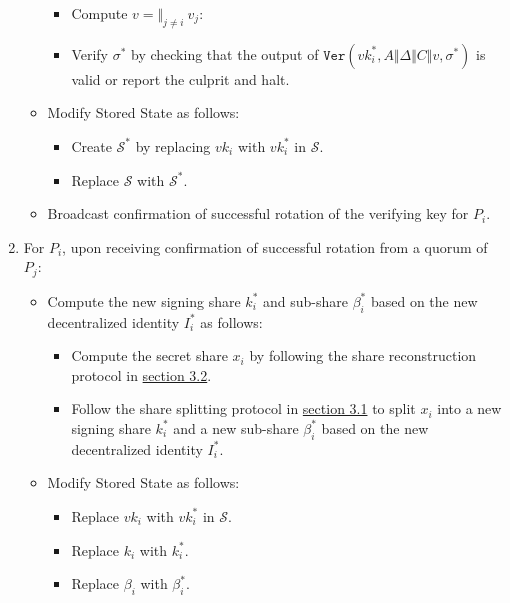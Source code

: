 \documentclass[
]{article}
\providecommand{\tightlist}{%
  \setlength{\itemsep}{0pt}\setlength{\parskip}{0pt}}
\begin{document}
\begin{enumerate}
\begin{itemize}
    \begin{itemize}
    \tightlist
    \item
      Compute \(v = \Vert _{j \neq i} \: v_j\):
    \item
      Verify \(\sigma ^ \ast\) by checking that the output of
      \(\mathtt{Ver}(vk_i^ \ast, A \Vert \Delta \Vert C \Vert v, \sigma ^ \ast)\)
      is valid or report the culprit and halt.
    \end{itemize}
  \item
    Modify Stored State as follows:

    \begin{itemize}
    \tightlist
    \item
      Create \(\mathcal{S} ^ \ast\) by replacing \(vk_i\) with
      \(vk_i^ \ast\) in \(\mathcal{S}\).
    \item
      Replace \(\mathcal{S}\) with \(\mathcal{S} ^ \ast\).
    \end{itemize}
  \item
    Broadcast confirmation of successful rotation of the verifying key
    for \(P_i\).
  \end{itemize}
\item
  For \(P_i\), upon receiving confirmation of successful rotation from a
  quorum of \(P_j\):

  \begin{itemize}
  \tightlist
  \item
    Compute the new signing share \(k_i^ \ast\) and sub-share
    \(\beta _i^ \ast\) based on the new decentralized identity
    \(I_i^ \ast\) as follows:

    \begin{itemize}
    \tightlist
    \item
      Compute the secret share \(x_i\) by following the share
      reconstruction protocol in
      \protect\hyperlink{share-reconstruction}{section 3.2}.
    \item
      Follow the share splitting protocol in
      \protect\hyperlink{share-splitting}{section 3.1} to split \(x_i\)
      into a new signing share \(k_i^ \ast\) and a new sub-share
      \(\beta _i^ \ast\) based on the new decentralized identity
      \(I_i^ \ast\).
    \end{itemize}
  \item
    Modify Stored State as follows:

    \begin{itemize}
    \tightlist
    \item
      Replace \(vk_i\) with \(vk_i^ \ast\) in \(\mathcal{S}\).
    \item
      Replace \(k_i\) with \(k_i^ \ast\).
    \item
      Replace \(\beta _i\) with \(\beta _i^ \ast\).
    \end{itemize}
  \end{itemize}
\end{enumerate}
\end{document}
